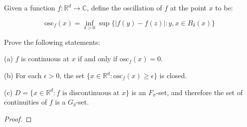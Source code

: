 \documentclass[10pt]{article}
\newenvironment{problem}[2][Problem]{\begin{trivlist}
\item[\hskip \labelsep {\bfseries #1}\hskip \labelsep {\bfseries #2.}]}{\end{trivlist}}
\begin{document}
\begin{problem}{2.2.47}
Given a function $f: \mathbb{R}^d \rightarrow \mathbb{C}$, define the oscillation of $f$ at the point $x$ to be:

$$\text{osc}_f(x) = \inf_{\delta > 0} \sup \{ | f(y) - f(z) | : y,x \in B_\delta(x) \}$$

Prove the following statements:

(a) $f$ is continuous at $x$ if and only if $\text{osc}_f(x) = 0$.

(b) For each $\epsilon > 0$, the set $\{ x \in \mathbb{R}^d : \text{osc}_f(x) \geq \epsilon \}$ is closed.

(c) $D = \{ x \in \mathbb{R}^d : f \text{ is discontinuous at } x\}$ is an $F_\sigma$-set, and therefore the set of continuities of $f$ is a $G_\delta$-set.
\end{problem}

\begin{proof}[Proof]

\end{proof}
\end{document}
